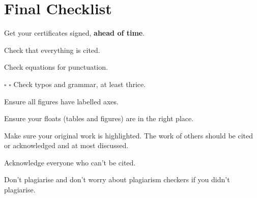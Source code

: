 \chapter{Final Checklist}
\large
\begin{todolist}
	\item Get your certificates signed, \textbf{ahead of time}.
	\item Check that everything is cited.
	\item Check equations for punctuation.
	\item $\square$ $\square$ Check typos and grammar, at least thrice.
	\item Ensure all figures have labelled axes.
	\item Ensure your floats (tables and figures) are in the right place.
	\item Make sure your original work is highlighted. The work of others should be cited or acknowledged and at most discussed.
	\item Acknowledge everyone who can't be cited.
	\item Don't plagiarise and don't worry about plagiarism checkers if you didn't\\ plagiarise.
\end{todolist}

